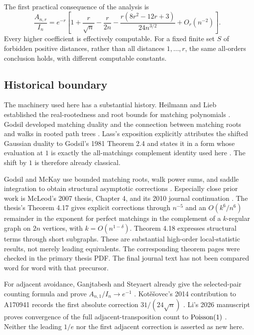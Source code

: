 \documentclass[11pt,letterpaper]{article}
\theoremstyle{remark}\newtheorem{remark}[theorem]{Remark}
\begin{document}
The first practical consequence of the analysis is
\begin{equation}\label{fdi:eq:main-column}
 \frac{A_{n,r}}{I_n}=e^{-r}\left[1+\frac r{\sqrt n}-\frac r{2n}
 -\frac{r(8r^2-12r+3)}{24n^{3/2}}+O_r(n^{-2})\right].
\end{equation}
Every higher coefficient is effectively computable. For a fixed finite set $S$ of forbidden positive distances, rather than all distances $1,\ldots,r$, the same all-orders conclusion holds, with different computable constants.

\subsection{Historical boundary}\label{fdi:sec:history}
The machinery used here has a substantial history. Heilmann and Lieb established the real-rootedness and root bounds for matching polynomials \cite{heilmannlieb}. Godsil developed matching duality and the connection between matching roots and walks in rooted path trees \cite{godsilduality,godsilwalks}. Lass's exposition explicitly attributes the shifted Gaussian duality to Godsil's 1981 Theorem 2.4 and states it in a form whose evaluation at $1$ is exactly the all-matchings complement identity used here \cite{lass}. The shift by $1$ is therefore already classical.

Godsil and McKay use bounded matching roots, walk power sums, and saddle integration to obtain structural asymptotic corrections \cite{godsil-mckay}. Especially close prior work is McLeod's 2007 thesis, Chapter 4, and its 2010 journal continuation \cite{mcleodthesis,mcleod}. The thesis's Theorem 4.17 gives explicit corrections through $n^{-5}$ and an $O(k^6/n^6)$ remainder in the exponent for perfect matchings in the complement of a $k$-regular graph on $2n$ vertices, with $k=O(n^{1-\delta})$. Theorem 4.18 expresses structural terms through short subgraphs. These are substantial high-order local-statistic results, not merely leading equivalents. The corresponding theorem pages were checked in the primary thesis PDF. The final journal text has not been compared word for word with that precursor.

For adjacent avoidance, Ganjtabesh and Steyaert already give the selected-pair counting formula and prove $A_{n,1}/I_n\to e^{-1}$ \cite{ganjtabesh}. Kot\v{e}\v{s}ovec's 2014 contribution to A170941 records the first absolute correction $31/(24\sqrt n)$ \cite{oeis170941}. Li's 2026 manuscript proves convergence of the full adjacent-transposition count to $\operatorname{Poisson}(1)$ \cite{li}. Neither the leading $1/e$ nor the first adjacent correction is asserted as new here.
\end{document}
